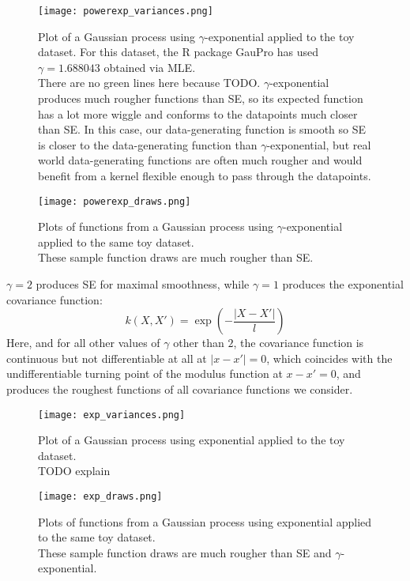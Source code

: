 \begin{figure}[H]
    \texttt{[image: powerexp\_variances.png]}
    \caption{
        Plot of a Gaussian process using $\gamma$-exponential applied to the toy dataset. For this dataset, the R package GauPro \cite{gaopro} has used $\gamma = 1.688043$ obtained via MLE. \\
        There are no green lines here because TODO. $\gamma$-exponential produces much rougher functions than SE, so its expected function has a lot more wiggle and conforms to the datapoints much closer than SE. In this case, our data-generating function is smooth so SE is closer to the data-generating function than $\gamma$-exponential, but real world data-generating functions are often much rougher and would benefit from a kernel flexible enough to pass through the datapoints.
    }
\end{figure}

\begin{figure}[H]
    \texttt{[image: powerexp\_draws.png]}
    \caption{
        Plots of functions from a Gaussian process using $\gamma$-exponential applied to the same toy dataset. \\
        These sample function draws are much rougher than SE.
    }
\end{figure}

$\gamma = 2$ produces SE for maximal smoothness, while $\gamma = 1$ produces the exponential covariance function:
\begin{equation*}
    k(X,X') = \exp \left(-\frac{|X - X'|}{l} \right)
\end{equation*}
Here, and for all other values of $\gamma$ other than $2$, the covariance function is continuous but not differentiable at all at $|x - x'| = 0$, which coincides with the undifferentiable turning point of the modulus function at $x - x' = 0$, and produces the roughest functions of all covariance functions we consider.

\begin{figure}[H]
    \texttt{[image: exp\_variances.png]}
    \caption{
        Plot of a Gaussian process using exponential applied to the toy dataset. \\
        TODO explain
    }
\end{figure}

\begin{figure}[H]
    \texttt{[image: exp\_draws.png]}
    \caption{
        Plots of functions from a Gaussian process using exponential applied to the same toy dataset. \\
        These sample function draws are much rougher than SE and $\gamma$-exponential.
    }
\end{figure}


